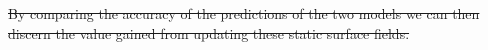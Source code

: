 \documentclass[hess, twostagejnl]{copernicus}
\providecommand{\DIFadd}[1]{{\protect\color{blue}\uwave{#1}}} %
\providecommand{\DIFdel}[1]{{\protect\color{red}\sout{#1}}}                      %
\providecommand{\DIFdelbegin}{} %
\providecommand{\DIFdelend}{} %
\providecommand{\DIFaddFL}[1]{\DIFadd{#1}} %
\providecommand{\DIFdelFL}[1]{\DIFdel{#1}} %
\providecommand{\DIFaddbeginFL}{} %
\providecommand{\DIFaddendFL}{} %
\providecommand{\DIFdelbeginFL}{} %
\providecommand{\DIFdelendFL}{} %
\begin{document}
% 		
%
 
\DIFdelbegin %
\DIFdel{By comparing the accuracy of the predictions of the two models we can then discern the value gained from updating these static surface fields. }%
\DIFdelend 
\end{document}
